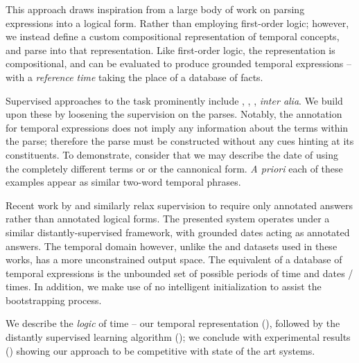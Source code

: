 This approach draws inspiration from a large body of work
	on parsing expressions into a logical form.
Rather than employing first-order logic; however,
	we instead define a custom compositional representation of temporal
	concepts, and parse into that representation.
Like first-order logic, the representation is compositional, and can be
	evaluated to produce grounded temporal expressions
	-- with a \textit{reference time} taking the place of a database 
	of facts.

Supervised approaches to the task prominently include
	,
	,
	, 
	\textit{inter alia}.
We build upon these by loosening the supervision on the parses.
Notably, the annotation for temporal expressions does not imply any information
	about the terms within the parse; therefore the parse must be constructed
	without any cues hinting at its constituents.
To demonstrate, consider that we may describe the date of 
	using the completely different terms  or  or the cannonical \tp{[month] [day]} form.
\textit{A priori} each of these examples appear as similar two-word
	temporal phrases.

Recent work by  and 
	 similarly relax supervision 
	to require only annotated answers rather than annotated logical forms.
The presented system operates under a similar distantly-supervised framework,
	with grounded dates acting as annotated answers.
The temporal domain however, unlike the  and 
	datasets used in these works, has a more unconstrained output space.
The equivalent of a database of temporal expressions is the
	unbounded set of possible periods of time and dates / times.
In addition, we  make use of no intelligent
	initialization to assist the bootstrapping process.

We describe the \textit{logic} of time -- our temporal representation
	(), followed by the distantly supervised learning algorithm
	(); we conclude with experimental results 
	() showing our
	approach to be competitive with state of the art systems.
